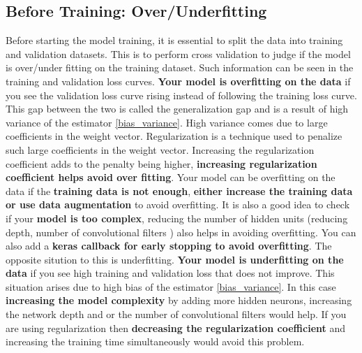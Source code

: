 \documentclass[a4paper,10pt]{article}
\begin{document}
\subsection{Before Training: Over/Underfitting \label{over_under}}
Before starting the model training, it is essential to split the data into training and validation datasets. This is to perform cross validation to judge if the model is over/under fitting on the training dataset. Such information can be seen in the training and validation loss curves. \newline
\textbf{Your model is overfitting on the data} if you see the validation loss curve rising instead of following the training loss curve. This gap between the two is called the generalization gap and is a result of high variance of the estimator \ref{bias_variance}. High variance comes due to large coefficients in the weight vector. Regularization is a technique used to penalize such large coefficients in the weight vector. Increasing the regularization coefficient adds to the penalty being higher, \textbf{increasing regularization coefficient helps avoid over fitting}. Your model can be overfitting on the data if the \textbf{training data is not enough}, \textbf{either increase the training data or use data augmentation} to avoid overfitting. It is also a good idea to check if your \textbf{model is too complex}, reducing the number of hidden units (reducing depth, number of convolutional filters \label{model_hyp}) also helps in avoiding overfitting. You can also add a \textbf{keras callback \label{keras_train_features} for early stopping to avoid overfitting}.  
The opposite sitution to this is underfitting.\newline
\textbf{Your model is underfitting on the data} if you see high training and validation loss that does not improve. This situation arises due to high bias of the estimator \ref{bias_variance}. In this case \textbf{increasing the model complexity} by adding more hidden neurons, increasing the network depth and or the number of convolutional filters would help. If you are using regularization then \textbf{decreasing the regularization coefficient} and increasing the training time simultaneously would avoid this problem.
\end{document}
